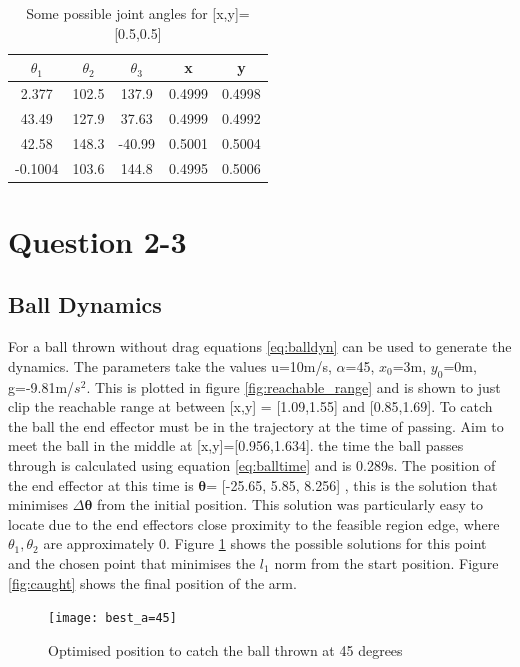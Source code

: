 \documentclass[twoside,twocolumn]{article}
\begin{document}
\begin{table}[h]
\centering 
\begin{tabular}{ c | c | c | c | c }
$\theta_1$&$\theta_2$&$\theta_3$ & x & y \\ 

\midrule
2.377&102.5&137.9&0.4999&0.4998\\
43.49&127.9&37.63&0.4999&0.4992\\
42.58&148.3&-40.99&0.5001&0.5004\\
-0.1004&103.6&144.8&0.4995&0.5006\\
\end{tabular}
\caption{Some possible joint angles for [x,y]=[0.5,0.5]}
\label{table:jointangle}
\end{table}



\section{Question 2-3}
\subsection{Ball Dynamics}
For a ball thrown without drag equations \ref{eq:balldyn} can be used to generate the dynamics. The parameters take the values u=10m/s, $\alpha$=45, $x_0$=3m, $y_0$=0m, g=-9.81m/$s^2$. This is plotted in figure \ref{fig:reachable_range} and is shown to just clip the reachable range at between [x,y] = [1.09,1.55] and [0.85,1.69]. To catch the ball the end effector must be in the trajectory at the time of passing. Aim to meet the ball in the middle at [x,y]=[0.956,1.634]. the time the ball passes through is calculated using equation \ref{eq:balltime} and is 0.289s. 
\newline
The position of the end effector at this time is $\boldsymbol{\theta}$= [-25.65, 5.85, 8.256] , this is the solution that minimises $\Delta\boldsymbol{\theta}$ from the initial position. This solution was particularly easy to locate due to the end effectors close proximity to the feasible region edge, where $\theta_1, \theta_2$ are approximately 0. Figure \ref{fig:a=45} shows the possible solutions for this point and the chosen point that minimises the $l_1$ norm from the start position. Figure \ref{fig:caught} shows the final position of the arm.

\begin{figure}[h]
  \centering
    \texttt{[image: best\_a=45]}
  \caption{Optimised position to catch the ball thrown at 45 degrees}
  \label{fig:a=45}
\end{figure}
\end{document}
